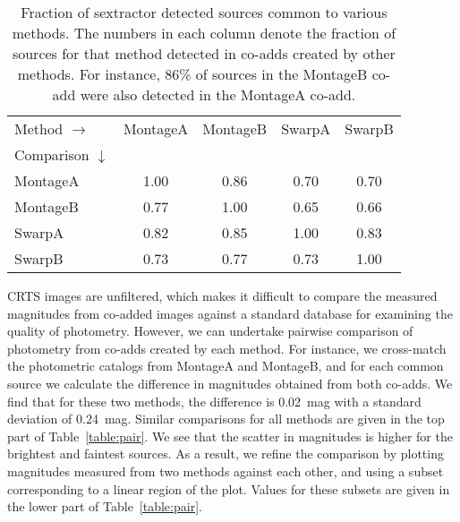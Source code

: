 \documentclass[fleqn,usenatbib]{mnras}
\begin{document}
\begin{table}
\centering
\begin{tabular}{lcccc}
\hline
Method $\longrightarrow$ & MontageA & MontageB & SwarpA & SwarpB\\
Comparison $\downarrow$ & & & & \\
 \hline
MontageA & 1.00 & 0.86 & 0.70  & 0.70  \\
MontageB & 0.77 & 1.00 & 0.65 & 0.66  \\  
SwarpA & 0.82 & 0.85 & 1.00 & 0.83  \\
SwarpB & 0.73 & 0.77 & 0.73 & 1.00 \\
\hline
\end{tabular}
\caption{Fraction of sextractor detected sources common to various methods. The numbers in each column denote the fraction of sources for that method detected in co-adds created by other methods. For instance, 86\% of sources in the MontageB co-add were also detected in the MontageA co-add. }
\label{tab:commonfrac}
\end{table}

CRTS images are unfiltered, which makes it difficult to compare the measured magnitudes from co-added images against a standard database for examining the quality of photometry. However, we can undertake pairwise comparison of photometry from co-adds created by each method. For instance, we cross-match the photometric catalogs from MontageA and MontageB, and for each common source we calculate the difference in magnitudes obtained from both co-adds. We find that for these two methods, the difference is 0.02~mag with a standard deviation of 0.24~mag. Similar comparisons for all methods are given in the top part of Table~\ref{table:pair}. We see that the scatter in magnitudes is higher for the brightest and faintest sources. As a result, we refine the comparison by plotting magnitudes measured from two methods against each other, and using a subset corresponding to a linear region of the plot. Values for these subsets are given in the lower part of Table~\ref{table:pair}.
\end{document}

